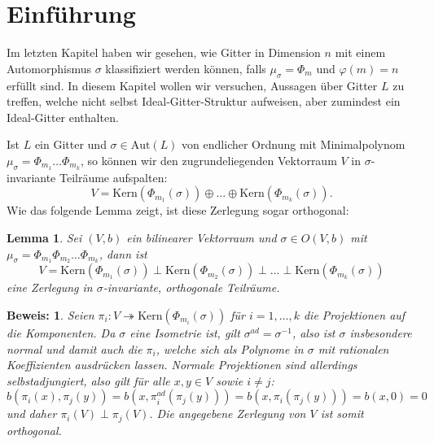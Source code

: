 \documentclass[12pt,a4paper,halfparskip,headsepline,bibtotocnumbered]{scrreprt}
\theoremstyle{nummermitklammern}
\newtheorem{lemma}[defsatzusw]{Lemma}
\theoremstyle{nonumberbreak}
\newtheorem{beweis}{Beweis:}
\newcommand{\Kern}{\text{Kern}}
\newcommand{\Aut}{\text{Aut}}
\begin{document}
\section{Einführung}
Im letzten Kapitel haben wir gesehen, wie Gitter in Dimension $n$ mit einem Automorphismus $\sigma$ klassifiziert werden können, falls $\mu_\sigma = \Phi_m$ und $\varphi(m) = n$ erfüllt sind. In diesem Kapitel wollen wir versuchen, Aussagen über Gitter $L$ zu treffen, welche nicht selbst Ideal-Gitter-Struktur aufweisen, aber zumindest ein Ideal-Gitter enthalten.\par
Ist $L$ ein Gitter und $\sigma \in \Aut(L)$ von endlicher Ordnung mit Minimalpolynom $\mu_\sigma = \Phi_{m_1} \dots \Phi_{m_k}$, so können wir den zugrundeliegenden Vektorraum $V$ in $\sigma$-invariante Teilräume aufspalten:
\begin{equation*}
	V = \Kern(\Phi_{m_1}(\sigma)) \oplus \dots \oplus \Kern(\Phi_{m_k}(\sigma)).
\end{equation*}
Wie das folgende Lemma zeigt, ist diese Zerlegung sogar orthogonal:

\begin{framed}
	\begin{lemma}
		Sei $(V,b)$ ein bilinearer Vektorraum und $\sigma \in O(V,b)$ mit $\mu_\sigma = \Phi_{m_1} \Phi_{m_2} \dots \Phi_{m_k}$, dann ist
		\begin{equation*}
			V = \Kern(\Phi_{m_1}(\sigma)) \perp \Kern(\Phi_{m_2}(\sigma)) \perp \dots \perp \Kern(\Phi_{m_k}(\sigma))
		\end{equation*}
		eine Zerlegung in $\sigma$-invariante, orthogonale Teilräume.
	\end{lemma}
\end{framed}

\begin{beweis}
	Seien $\pi_i : V \twoheadrightarrow \Kern(\Phi_{m_i}(\sigma))$ für $i=1,\dots,k$ die Projektionen auf die Komponenten. Da $\sigma$ eine Isometrie ist, gilt $\sigma^{ad} = \sigma^{-1}$, also ist $\sigma$ insbesondere normal und damit auch die $\pi_i$, welche sich als Polynome in $\sigma$ mit rationalen Koeffizienten ausdrücken lassen. Normale Projektionen sind allerdings selbstadjungiert, also gilt für alle $x,y \in V$ sowie $i \neq j$:
		\begin{equation*}
			b(\pi_i(x), \pi_j(y)) = b(x, \pi_i^{ad} (\pi_j(y))) = b(x, \pi_i(\pi_j(y))) = b(x,0) = 0
		\end{equation*}
		und daher $\pi_i(V) \perp \pi_j(V)$. Die angegebene Zerlegung von $V$ ist somit orthogonal.
\end{beweis}
\end{document}

